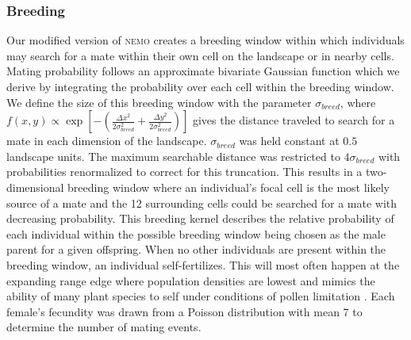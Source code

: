\subsubsection*{Breeding}
Our modified version of \textsc{nemo} creates a breeding window within which individuals may search for a mate within their own cell on the landscape or in nearby cells. Mating probability follows an approximate bivariate Gaussian function which we derive by integrating the probability over each cell within the breeding window. We define the size of this breeding window with the parameter $\sigma_{breed}$, where $f(x,y) \propto \exp{[-(\frac{\Delta x^2}{2\sigma_{breed}^2}+\frac{\Delta y^2}{2\sigma_{breed}^2})]}$ gives the distance traveled to search for a mate in each dimension of the landscape. $\sigma_{breed}$ was held constant at $0.5$ landscape units. The maximum searchable distance was restricted to $4\sigma_{breed}$ with probabilities renormalized to correct for this truncation. This results in a two-dimensional breeding window where an individual's focal cell is the most likely source of a mate and the 12 surrounding cells could be searched for a mate with decreasing probability. This breeding kernel describes the relative probability of each individual within the possible breeding window being chosen as the male parent for a given offspring. When no other individuals are present within the breeding window, an individual self-fertilizes. This will most often happen at the expanding range edge where population densities are lowest and mimics the ability of many plant species to self under conditions of pollen limitation \citep{Hargreaves:2014}. Each female's fecundity was drawn from a Poisson distribution with mean 7 to determine the number of mating events. 

